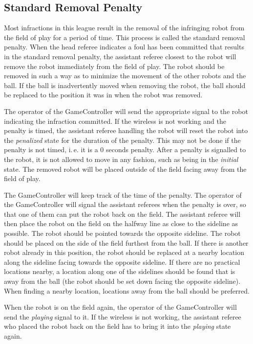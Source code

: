 \documentclass[12pt]{article}
\newcommand{\ie}{\mbox{i.\,e.}\xspace}
\begin{document}
\subsection{Standard Removal Penalty}
\label{sec:removal_penalty}

Most infractions in this league result in the removal of the
infringing robot from the field of play for a period of time.  This
process is called the standard removal penalty.  When the head
referee indicates a foul has been committed that results in the
standard removal penalty, the assistant referee closest to the robot
will remove the robot immediately from the field of play.  The robot
should be removed in such a way as to minimize the movement of the
other robots and the ball.  If the ball is inadvertently moved when
removing the robot, the ball should be replaced to the position it
was in when the robot was removed.

The operator of the GameController will send the appropriate signal
to the robot indicating the infraction committed.
If the wireless is
not working and the penalty is timed, the assistant referee handling
the robot will reset the robot into the \emph{penalized} state for
the duration of the penalty.
This may not be done if the penalty is not
timed, \ie it is a 0 seconds penalty. After a penalty is signalled
to the robot, it is not allowed to move in any fashion, such as being
in the \emph{initial} state. The removed robot will be placed
outside of the field facing away from the field of play.

The GameController will keep track of the time of the penalty. The
operator of the GameController will signal the assistant referees
when the penalty is over, so that one of them can put the robot back
on the field. The assistant referee will then place the robot on the
field on the halfway line as close to the sideline as possible.  The
robot should be pointed towards the opposite sideline.  The robot
should be placed on the side of the field furthest from the ball.
If there is another robot already in this position, the robot should
be replaced at a nearby location along the sideline facing towards
the opposite sideline.  If there are no practical locations nearby,
a location along one of the sidelines should be found that is away
from the ball (the robot should be set down facing the opposite
sideline).  When finding a nearby location, locations away from the
ball should be preferred.

When the robot is on the field again, the operator of the
GameController will send the \emph{playing} signal to it.
If the
wireless is not working, the assistant referee who placed the robot
back on the field has to bring it into the \emph{playing} state
again.
\end{document}
